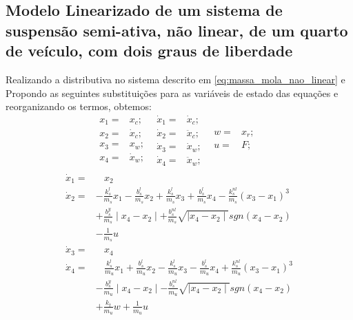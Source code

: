 \documentclass[a4paper]{ifacconf}
\begin{document}
    \subsection{Modelo Linearizado de um sistema de suspensão semi-ativa, não linear, de um quarto de veículo, com dois graus de liberdade }
    Realizando a distributiva no sistema descrito em \ref{eq:massa_mola_nao_linear} e Propondo as seguintes substituições para as variáveis de estado das equações e reorganizando os termos, obtemos: 
    \begin{equation*}
        \begin{split}
            x_{1}=&x_{c};\ \ \\
            x_{2}=&\dot{x}_{c};\ \ \\
            x_{3}=&x_{w};\ \ \\
            x_{4}=&\dot{x}_{w};\ \ \\
        \end{split}
        \begin{split}
            \dot{x}_{1}=&\dot{x}_{c};\ \ \\
            \dot{x}_{2}=&\ddot{x}_{c};\ \ \\
            \dot{x}_{3}=&\dot{x}_{w};\ \ \\
            \dot{x}_{4}=&\ddot{x}_{w};\ \ \\
        \end{split}
        \begin{split}
            w=&x_{r};\ \ \\
            u=&F;\ \ \\
        \end{split} 
    \end{equation*}
    \begin{equation} \label{eq:massa_mola_nao_linear}
        \begin{aligned}
        \dot{x}_{1}=&\ \ \ \ x_{2}\\
        \dot{x}_{2}=&-\frac{k^l_s}{m_s}x_1-\frac{b^l_s}{m_s}x_2+\frac{k^l_s}{m_s}x_3+\frac{b^l_s}{m_s}x_4-\frac{k^{nl}_s}{m_s}(x_3-x_1)^3\\
                    &+\frac{b^y_s}{m_s}\mid x_4-x_2\mid+\frac{b^{nl}_s}{m_s}\sqrt{\mid x_4-x_2\mid}sgn(x_4-x_2)\\
                    &-\frac{1}{m_s}u\\
        \dot{x}_{3}=&\ \ \ \ x_{4}\\
        \dot{x}_{4}=&\ \ \ \ \frac{k^l_s}{m_u}x_1+\frac{b^l_s}{m_u}x_2-\frac{k^l_s}{m_u}x_3-\frac{b^l_s}{m_u}x_4+\frac{k^{nl}_s}{m_u}(x_3-x_1)^3\\
                    &-\frac{b^y_s}{m_u}\mid x_4-x_2\mid-\frac{b^{nl}_s}{m_u}\sqrt{\mid x_4-x_2\mid}sgn(x_4-x_2)\\
                    &+\frac{k_t}{m_u}w+\frac{1}{m_u}u\\
        \end{aligned}
    \end{equation}
    
\end{document}
